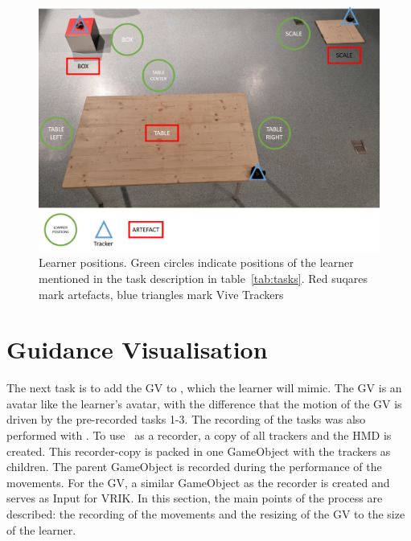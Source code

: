\begin{figure}[htb]
	\centering
	\includegraphics[width=\textwidth]{figures/learner_positions.png}
	\caption[Learner positions]{Learner positions. Green circles indicate positions of the learner mentioned in the task description in table~\ref{tab:tasks}. Red suqares mark artefacts, blue triangles mark Vive Trackers}
	\label{fig:learner_positions}
\end{figure}

\section{Guidance Visualisation}
\label{sec:gv}
The next task is to add the GV to \exgo, which the learner will mimic. The GV is an avatar like the learner's avatar, with the difference that the motion of the GV is driven by the pre-recorded tasks 1-3. The recording of the tasks was also performed with \exgo. To use \exgo\ as a recorder, a copy of all trackers and the HMD is created. This recorder-copy is packed in one GameObject with the trackers as children. The parent GameObject is recorded during the performance of the movements. For the GV, a similar GameObject as the recorder is created and serves as Input for VRIK. In this section, the main points of the process are described: the recording of the movements and the resizing of the GV to the size of the learner.\\

